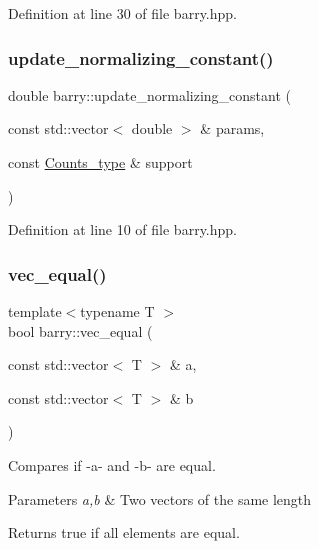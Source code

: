 Definition at line 30 of file barry.\+hpp.

\mbox{\label{namespacebarry_a822db820c95822d0e7a51728d9b9858d}} 
\subsubsection{\texorpdfstring{update\+\_\+normalizing\+\_\+constant()}{update\_normalizing\_constant()}}
{\footnotesize\ttfamily double barry\+::update\+\_\+normalizing\+\_\+constant (\begin{DoxyParamCaption}\item[{const std\+::vector$<$ double $>$ \&}]{params,  }\item[{const \hyperlink{namespacebarry_a3e2d8c3b6cf602107559d4237d9f1315}{Counts\+\_\+type} \&}]{support }\end{DoxyParamCaption})\hspace{0.3cm}{\ttfamily [inline]}}



Definition at line 10 of file barry.\+hpp.

\mbox{\label{namespacebarry_afbdb85734a7793890ea4268ea114858e}} 
\subsubsection{\texorpdfstring{vec\+\_\+equal()}{vec\_equal()}}
{\footnotesize\ttfamily template$<$typename T $>$ \\
bool barry\+::vec\+\_\+equal (\begin{DoxyParamCaption}\item[{const std\+::vector$<$ T $>$ \&}]{a,  }\item[{const std\+::vector$<$ T $>$ \&}]{b }\end{DoxyParamCaption})\hspace{0.3cm}{\ttfamily [inline]}}



Compares if -\/a-\/ and -\/b-\/ are equal. 


\begin{DoxyParams}{Parameters}
{\em a,b} & Two vectors of the same length \\
\hline
\end{DoxyParams}
\begin{DoxyReturn}{Returns}
{\ttfamily true} if all elements are equal. 
\end{DoxyReturn}



